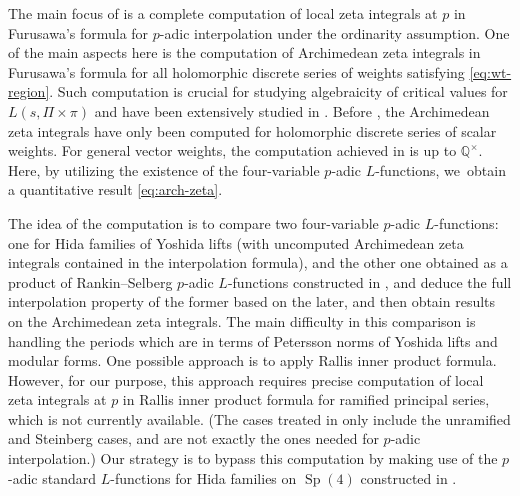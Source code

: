 \documentclass[JEP,XML,SOM,Unicode,published]{cedram}
\newcommand{\Lfunctions}{$L$\nobreakdash-func\-tions\xspace}
\theoremstyle{plain}
\theoremstyle{remark}
\newcommand{\bQ}{\mathbb{Q}}
\DeclareMathOperator{\Sp}{Sp}
\begin{document}
The main focus of \cite{pFL} is a complete computation of local zeta integrals at $p$ in Furusawa's formula for $p$-adic interpolation under the ordinarity assumption. One of the main aspects here is the computation of Archimedean zeta integrals in Furusawa's formula for all holomorphic discrete series of weights satisfying \eqref{eq:wt-region}. Such computation is crucial for studying algebraicity of critical values for $L(s,\Pi\times\pi)$ and have been extensively studied in \cite{Furusawa,PiSch,Saha,Pitale,Saha-pullback,Morimoto-GSp4GL2-I,Morimoto-GSp4GL2-II}. Before \cite{Morimoto-GSp4GL2-II}, the Archimedean zeta integrals have only been computed for holomorphic discrete series of scalar weights. For general vector weights, the computation achieved in \cite{Morimoto-GSp4GL2-II} is up to $\bQ^\times$. Here, by utilizing the existence of the four-variable $p$-adic \Lfunctions, we~obtain a quantitative result \eqref{eq:arch-zeta}.

The idea of the computation is to compare two four-variable $p$-adic \Lfunctions: one for Hida families of Yoshida lifts (with uncomputed Archimedean zeta integrals contained in the interpolation formula), and the other one obtained as a product of Rankin--Selberg $p$-adic \Lfunctions constructed in \cite{Hi88}, and deduce the full interpolation property of the former based on the later, and then obtain results on the Archimedean zeta integrals. The main difficulty in this comparison is handling the periods which are in terms of Petersson norms of Yoshida lifts and modular forms. One possible approach is to apply Rallis inner product formula. However, for our purpose, this approach requires precise computation of local zeta integrals at $p$ in Rallis inner product formula for ramified principal series, which is not currently available. (The cases treated in \cite{HsiehNamiInner} only include the unramified and Steinberg cases, and are not exactly the ones needed for $p$-adic interpolation.) Our strategy is to bypass this computation by making use of the $p$-adic standard \Lfunctions for Hida families on $\Sp(4)$ constructed in \cite{SLF}.
\end{document}
